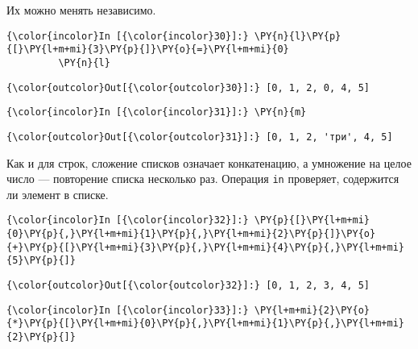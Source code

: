     Их можно менять независимо.

    \begin{Verbatim}[commandchars=\\\{\}]
{\color{incolor}In [{\color{incolor}30}]:} \PY{n}{l}\PY{p}{[}\PY{l+m+mi}{3}\PY{p}{]}\PY{o}{=}\PY{l+m+mi}{0}
         \PY{n}{l}
\end{Verbatim}

            \begin{Verbatim}[commandchars=\\\{\}]
{\color{outcolor}Out[{\color{outcolor}30}]:} [0, 1, 2, 0, 4, 5]
\end{Verbatim}
        
    \begin{Verbatim}[commandchars=\\\{\}]
{\color{incolor}In [{\color{incolor}31}]:} \PY{n}{m}
\end{Verbatim}

            \begin{Verbatim}[commandchars=\\\{\}]
{\color{outcolor}Out[{\color{outcolor}31}]:} [0, 1, 2, 'три', 4, 5]
\end{Verbatim}
        
    Как и для строк, сложение списков означает конкатенацию, а умножение на
целое число --- повторение списка несколько раз. Операция \texttt{in}
проверяет, содержится ли элемент в списке.

    \begin{Verbatim}[commandchars=\\\{\}]
{\color{incolor}In [{\color{incolor}32}]:} \PY{p}{[}\PY{l+m+mi}{0}\PY{p}{,}\PY{l+m+mi}{1}\PY{p}{,}\PY{l+m+mi}{2}\PY{p}{]}\PY{o}{+}\PY{p}{[}\PY{l+m+mi}{3}\PY{p}{,}\PY{l+m+mi}{4}\PY{p}{,}\PY{l+m+mi}{5}\PY{p}{]}
\end{Verbatim}

            \begin{Verbatim}[commandchars=\\\{\}]
{\color{outcolor}Out[{\color{outcolor}32}]:} [0, 1, 2, 3, 4, 5]
\end{Verbatim}
        
    \begin{Verbatim}[commandchars=\\\{\}]
{\color{incolor}In [{\color{incolor}33}]:} \PY{l+m+mi}{2}\PY{o}{*}\PY{p}{[}\PY{l+m+mi}{0}\PY{p}{,}\PY{l+m+mi}{1}\PY{p}{,}\PY{l+m+mi}{2}\PY{p}{]}
\end{Verbatim}

